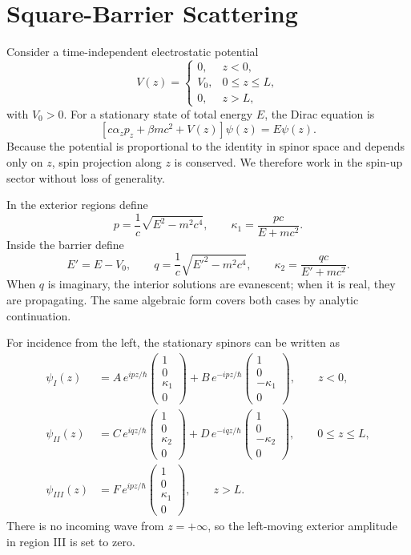 \documentclass[12pt]{article}
\newcommand{\be}{\begin{equation}}
\newcommand{\ee}{\end{equation}}
\numberwithin{equation}{section}
\begin{document}
\section{Square-Barrier Scattering}

Consider a time-independent electrostatic potential
\be
 V(z)=
 \begin{cases}
 0, & z<0,\\
 V_0, & 0\leq z\leq L,\\
 0, & z>L,
 \end{cases}
\label{eq:barrier}
\ee
with $V_0>0$. For a stationary state of total energy $E$, the Dirac equation is
\be
 \left[c\alpha_z p_z+\beta mc^2+V(z)\right]\psi(z)=E\psi(z).
\label{eq:barrier_dirac}
\ee
Because the potential is proportional to the identity in spinor space and depends only on $z$, spin projection along $z$ is conserved. We therefore work in the spin-up sector without loss of generality.

In the exterior regions define
\be
 p=\frac{1}{c}\sqrt{E^2-m^2c^4},
 \qquad
 \kappa_1=\frac{pc}{E+mc^2}.
\label{eq:p_kappa1}
\ee
Inside the barrier define
\be
 E'=E-V_0,
 \qquad
 q=\frac{1}{c}\sqrt{{E'}^2-m^2c^4},
 \qquad
 \kappa_2=\frac{qc}{E'+mc^2}.
\label{eq:q_kappa2}
\ee
When $q$ is imaginary, the interior solutions are evanescent; when it is real, they are propagating. The same algebraic form covers both cases by analytic continuation.

For incidence from the left, the stationary spinors can be written as
\begin{align}
 \psi_I(z)
 &=A\,e^{ipz/\hbar}
 \begin{pmatrix}1\\0\\\kappa_1\\0\end{pmatrix}
 +B\,e^{-ipz/\hbar}
 \begin{pmatrix}1\\0\\-\kappa_1\\0\end{pmatrix},
 \qquad z<0,
 \label{eq:region1}\\[1mm]
 \psi_{II}(z)
 &=C\,e^{iqz/\hbar}
 \begin{pmatrix}1\\0\\\kappa_2\\0\end{pmatrix}
 +D\,e^{-iqz/\hbar}
 \begin{pmatrix}1\\0\\-\kappa_2\\0\end{pmatrix},
 \qquad 0\leq z\leq L,
 \label{eq:region2}\\[1mm]
 \psi_{III}(z)
 &=F\,e^{ipz/\hbar}
 \begin{pmatrix}1\\0\\\kappa_1\\0\end{pmatrix},
 \qquad z>L.
 \label{eq:region3}
\end{align}
There is no incoming wave from $z=+\infty$, so the left-moving exterior amplitude in region III is set to zero.
\end{document}
